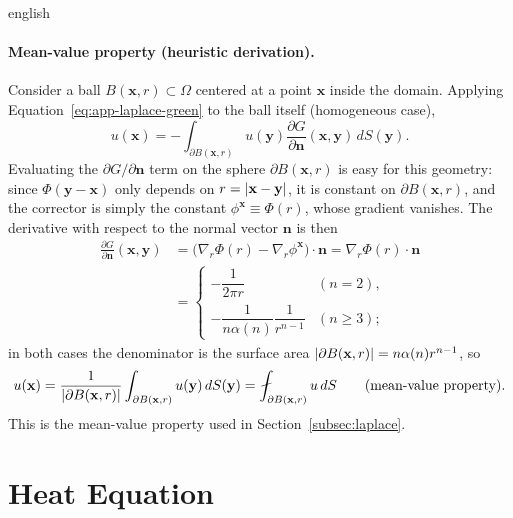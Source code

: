 \documentclass[../0000.tex]{subfiles}
\begin{document}
\begin{hyphenrules}{english}
\paragraph{Mean-value property (heuristic derivation).}
Consider a ball $B(\mathbf{x},r)\subset\Omega$ centered at a point $\mathbf{x}$ inside the domain. Applying
Equation~\eqref{eq:app-laplace-green} to the ball itself (homogeneous case),
\begin{equation}
  u(\mathbf{x})=-\int_{\partial B(\mathbf{x},r)}u(\mathbf{y})\frac{\partial G}{\partial\mathbf{n}}(\mathbf{x},\mathbf{y})\,d S(\mathbf{y}).
  \label{eq:mvp-1}
\end{equation}
Evaluating the $\partial G/\partial\mathbf{n}$ term on the sphere $\partial B(\mathbf{x},r)$ is easy for this geometry:
since $\Phi(\mathbf{y}-\mathbf{x})$ only depends on $r=\left\lvert \mathbf{x}-\mathbf{y} \right\rvert$, it is constant on $\partial B(\mathbf{x},r)$, and the
corrector is simply the constant $\phi^{\mathbf{x}}\equiv\Phi(r)$, whose gradient vanishes. The derivative with
respect to the normal vector $\mathbf{n}$ is then
\begin{align}
  \frac{\partial G}{\partial\mathbf{n}}(\mathbf{x},\mathbf{y})
    &=\big(\nabla_r\Phi(r)-\nabla_r\phi^{\mathbf{x}}\big)\cdot\mathbf{n}=\nabla_r\Phi(r)\cdot\mathbf{n} \label{eq:mvp-2}\\
    &=\begin{cases}
        -\dfrac{1}{2\pi r} & (n=2),\\[2mm]
        -\dfrac{1}{n\alpha(n)}\dfrac{1}{r^{n-1}} & (n\ge3);
      \end{cases} \label{eq:mvp-3}
\end{align}
in both cases the denominator is the surface area $\left\lvert \partial B(\mathbf{x},r) \right\rvert=n\alpha(n)r^{n-1}$, so
\begin{equation}
  u(\mathbf{x})=\frac{1}{\abs{\partial B(\mathbf{x},r)}}\int_{\partial B(\mathbf{x},r)}u(\mathbf{y})\,d S(\mathbf{y})
  =\fint_{\partial B(\mathbf{x},r)}u\,d S \qquad\text{(mean-value property)}.
  \label{eq:app-mvp}
\end{equation}
This is the mean-value property used in Section~\ref{subsec:laplace}.

\section{Heat Equation}\label{app-sec:heat}


\end{hyphenrules}
\end{document}
